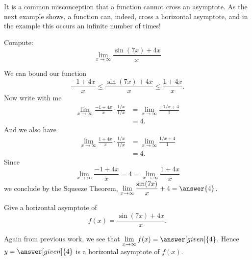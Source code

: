\documentclass{ximera}
\begin{document}
It is a common misconception that a function cannot cross an
asymptote. As the next example shows, a function can, indeed, cross a horizontal
asymptote, and in the example this occurs an infinite number of times!

\begin{example}
Compute:
\[
\lim_{x\to \infty} \frac{\sin(7x)+4x}{x}
\]
\begin{image}
\end{image}

\begin{explanation}
We can bound our function
\[
\frac{-1+4x}{x} \le \frac{\sin(7x)+4x}{x} \le \frac{1+4x}{x}.
\]
Now write with me
\begin{align*}
\displaystyle\lim_{x\to\infty}\frac{-1+4x}{x} \cdot \frac{1/x}{1/x} &= \lim_{x\to\infty}\frac{-1/x+4}{1}\\
&=4.
\end{align*}
And we also have
\begin{align*}
\displaystyle\lim_{x\to\infty}\frac{1+4x}{x} \cdot \frac{1/x}{1/x} &= \lim_{x\to\infty}\frac{1/x+4}{1}\\
&=4.
\end{align*}
Since 
\[
\lim_{x\to \infty} \frac{-1+4x}{x}  = 4 = \lim_{x\to \infty}\frac{1+4x}{x} 
\] 
we conclude by the Squeeze Theorem,
$\displaystyle\lim_{x\to\infty}\frac{\sin(7x)}{x}+4 = \answer{4}$.
\begin{example}
Give a horizontal asymptote of
\[
f(x) = \frac{\sin(7x)+4x}{x}.
\]
\begin{explanation}
Again from previous work, we see that $\displaystyle\lim_{x\to \infty} f(x) =
\answer[given]{4}$. Hence $y=\answer[given]{4}$ is a horizontal asymptote of $f(x)$.
\end{explanation}
\end{example}

\end{explanation}
\end{example}
\end{document}
